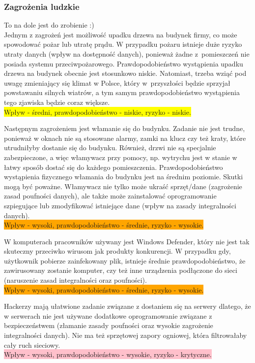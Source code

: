 \subsubsection{Zagrożenia ludzkie}
To na dole jest do zrobienie :)  \\
Jednym z zagrożeń jest możliwość upadku drzewa na budynek firmy, co może spowodować pożar lub utratę prądu. W przypadku pożaru istnieje duże ryzyko utraty danych (wpływ na dostępność danych), ponieważ żadne z~pomieszczeń nie posiada systemu przeciwpożarowego.  Prawdopodobieństwo wystąpienia upadku drzewa na budynek obecnie jest stosunkowo niskie. Natomiast, trzeba wziąć pod uwagę zmieniający się klimat w Polsce, który w~przyszłości będzie sprzyjał powstawaniu silnych wiatrów, a tym samym prawdopodobieństwo wystąpienia tego zjawiska będzie coraz większe. \\ \colorbox{yellow}{Wpływ - średni, prawdopodobieństwo - niskie, ryzyko - niskie.}

Następnym zagrożeniem jest włamanie się do budynku. Zadanie nie jest trudne, ponieważ w oknach nie są stosowane alarmy, zamki na klucz czy też kraty, które utrudniłyby dostanie się do budynku. Również, drzwi nie są specjalnie zabezpieczone, a więc włamywacz przy pomocy, np. wytrychu jest w stanie w łatwy sposób dostać się do każdego pomieszczenia. Prawdopodobieństwo wystąpienia fizycznego włamania do budynku jest na średnim poziomie. Skutki mogą być poważne. Włamywacz nie tylko może ukraść sprzęt/dane (zagrożenie zasad poufności danych), ale także może zainstalować oprogramowanie szpiegujące lub zmodyfikować istniejące dane (wpływ na zasady integralności danych). \\ \colorbox{orange}{Wpływ - wysoki, prawdopodobieństwo - średnie, ryzyko - wysokie.}

W komputerach pracowników używany jest Windows Defender, który nie jest tak skuteczny przeciwko wirusom jak produkty konkurencji. W przypadku gdy, użytkownik pobierze zainfekowany plik, istnieje średnie prawdopodobieństwo, że zawirusowany zostanie komputer, czy też inne urządzenia podłączone do sieci (naruszenie zasad integralności oraz poufności). \\ \colorbox{orange}{Wpływ - wysoki, prawdopodobieństwo - średnie, ryzyko - wysokie.}

Hackerzy mają ułatwione zadanie związane z dostaniem się na serwery dlatego, że w serwerach nie jest używane dodatkowe oprogramowanie związane z bezpieczeństwem (złamanie zasady poufności oraz wysokie zagrożenie integralności danych). Nie ma też sprzętowej zapory ogniowej, która filtrowałaby cały ruch sieciowy. \\ \colorbox{pink}{Wpływ - wysoki, prawdopodobieństwo - wysokie, ryzyko - krytyczne.}

